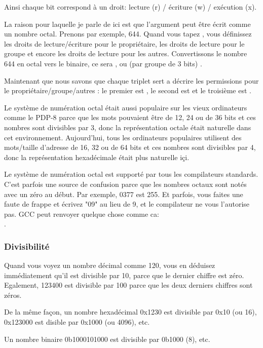Ainsi chaque bit correspond à un droit: lecture (r) / écriture (w) / exécution (x).

La raison pour laquelle je parle de  ici est que l'argument peut être écrit comme un nombre octal.
Prenons par exemple, 644.
Quand vous tapez , vous définissez les droits de lecture/écriture pour le propriétaire, les droits de lecture pour le groupe et encore les droits de lecture pour les autres.
Convertissons le nombre 644 en octal vers le binaire, ce sera , ou (par groupe de 3 bits) .

Maintenant que nous savons que chaque triplet sert a décrire les permissions pour le propriétaire/groupe/autres : le premier est , le second est  et le troisième est .

Le système de numération octal était aussi populaire sur les vieux ordinateurs comme le PDP-8 parce que les mots pouvaient être de 12, 24 ou de 36 bits et ces nombres sont divisibles par 3, donc la représentation octale était naturelle dans cet environnement.
Aujourd'hui, tous les ordinateurs populaires utilisent des mots/taille d'adresse de 16, 32 ou de 64 bits et ces nombres sont divisibles par 4, donc la représentation hexadécimale était plus naturelle içi.

Le système de numération octal est supporté par tous les compilateurs \CCpp standards.
C'est parfois une source de confusion parce que les nombres octaux sont notés avec un zéro au début. Par exemple, 0377 est 255.
Et parfois, vous faites une faute de frappe et écrivez "09" au lieu de 9, et le compilateur ne vous l'autorise pas.
GCC peut renvoyer quelque chose comme ca:\\
.

\subsubsection{Divisibilité}

Quand vous voyez un nombre décimal comme 120, vous en déduisez immédiatement qu'il est divisible par 10, parce que le dernier chiffre est zéro.
Egalement, 123400 est divisible par 100 parce que les deux derniers chiffres sont zéros.

De la même façon, un nombre hexadécimal 0x1230 est divisible par 0x10 (ou 16), 0x123000 est disible par 0x1000 (ou 4096), etc.

Un nombre binaire 0b1000101000 est divisible par 0b1000 (8), etc.

